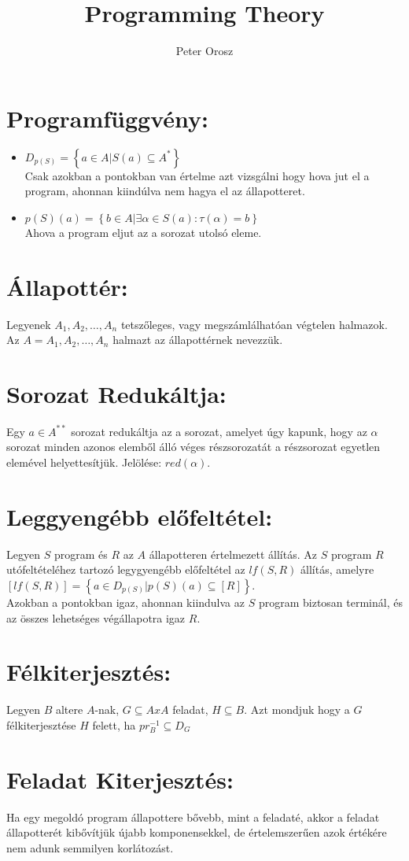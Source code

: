 \documentclass{article}
\title{Programming Theory}
\author{Peter Orosz}
\begin{document}
	\section{Programfüggvény:}
	\begin{itemize}
		\item $D_{p(S)} = \left\{a \in A | S(a) \subseteq A^*\right\}$\\
			Csak azokban a pontokban van értelme azt vizsgálni hogy hova jut el a program, ahonnan kiindúlva nem hagya el az állapotteret.
		\item $p(S)(a) = \left\{b \in A | \exists \alpha \in S(a) : \tau (\alpha) = b\right\}$ \\
			Ahova a program eljut az a sorozat utolsó eleme.
	\end{itemize}
	
	\section{Állapottér:}
	Legyenek $A_1, A_2, \dots, A_n$ tetszőleges, vagy megszámlálhatóan végtelen halmazok. Az $A = A_1, A_2, \dots, A_n$ halmazt az állapottérnek nevezzük.
	
	\section{Sorozat Redukáltja:}
	Egy $a \in A^{**}$ sorozat redukáltja az a sorozat, amelyet úgy kapunk, hogy az $\alpha$ sorozat minden azonos elemből álló véges részsorozatát a részsorozat egyetlen elemével helyettesítjük.	Jelölése: $red(\alpha)$.
	
	\section{Leggyengébb előfeltétel:}
	Legyen $S$ program és $R$ az $A$ állapotteren értelmezett állítás. Az $S$ program $R$ utófeltételéhez tartozó legygyengébb előfeltétel az $lf(S,R)$ állítás, amelyre $\left[lf(S,R)\right] = \left\{a \in D_{p(S)} | p(S)(a) \subseteq \left[R\right]\right\}$.\\
	Azokban a pontokban igaz, ahonnan kiindulva az $S$ program biztosan terminál, és az összes lehetséges végállapotra igaz $R$.
	
	\section{Félkiterjesztés:}
	Legyen $B$ altere $A$-nak, $G \subseteq A x A$ feladat, $H \subseteq B$. Azt mondjuk hogy a $G$ félkiterjesztése $H$ felett, ha $pr_B^{-1} \subseteq D_G$ 
	
	\section{Feladat Kiterjesztés:}
	Ha egy megoldó program állapottere bővebb, mint a feladaté, akkor a feladat állapotterét kibővítjük újabb komponensekkel, de értelemszerűen azok értékére nem adunk semmilyen korlátozást.
\end{document}
